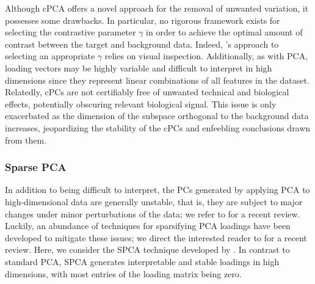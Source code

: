 Although cPCA offers a novel approach for the removal of unwanted variation, it possesses some drawbacks. In particular, no rigorous framework exists for selecting the contrastive parameter $\gamma$ in order to achieve the optimal amount of contrast between the target and background data. Indeed, \citet{Abid2018}'s  approach to selecting an appropriate $\gamma$ relies on visual inspection.  Additionally, as with PCA, loading vectors may be highly variable and difficult to interpret in high dimensions since they represent linear combinations of all features in the dataset. Relatedly, cPCs are not certifiably free of unwanted technical and biological effects, potentially obscuring relevant biological signal.  This issue is only exacerbated as the dimension of the subspace orthogonal to the background data increases, jeopardizing the stability of the cPCs and enfeebling conclusions drawn from them. 

\subsubsection{Sparse PCA}\label{spca}

In addition to being difficult to interpret, the PCs generated by applying PCA to high-dimensional data are generally unstable, that is, they are
subject to major changes under minor perturbations of the data; we refer to \citet{johnstone2018pca} for a recent review. Luckily, an abundance of techniques for sparsifying PCA loadings have been developed to mitigate these issues; we direct the interested reader to \citet{ZouReview2018} for a recent review. Here, we consider the SPCA technique developed by \citet{Zou2006}. In contrast to standard PCA, SPCA generates interpretable and stable loadings in high dimensions, with most entries of the loading matrix being zero.

